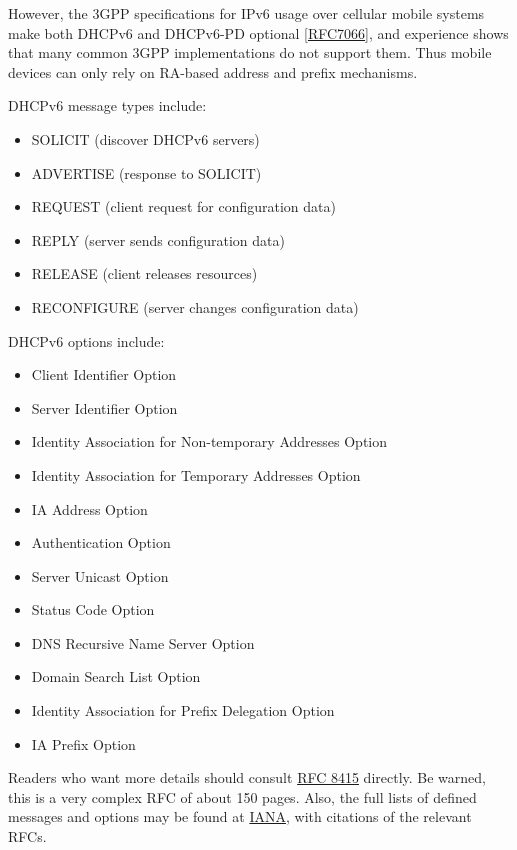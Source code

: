 \documentclass[
]{article}
\providecommand{\tightlist}{%
  \setlength{\itemsep}{0pt}\setlength{\parskip}{0pt}}
\begin{document}
However, the 3GPP specifications for IPv6 usage over cellular mobile
systems make both DHCPv6 and DHCPv6-PD optional
{[}\href{https://www.rfc-editor.org/info/rfc7066}{RFC7066}{]}, and
experience shows that many common 3GPP implementations do not support
them. Thus mobile devices can only rely on RA-based address and prefix
mechanisms.

DHCPv6 message types include:

\begin{itemize}
\tightlist
\item
  SOLICIT (discover DHCPv6 servers)
\item
  ADVERTISE (response to SOLICIT)
\item
  REQUEST (client request for configuration data)
\item
  REPLY (server sends configuration data)
\item
  RELEASE (client releases resources)
\item
  RECONFIGURE (server changes configuration data)
\end{itemize}

DHCPv6 options include:

\begin{itemize}
\tightlist
\item
  Client Identifier Option
\item
  Server Identifier Option
\item
  Identity Association for Non-temporary Addresses Option
\item
  Identity Association for Temporary Addresses Option
\item
  IA Address Option
\item
  Authentication Option
\item
  Server Unicast Option
\item
  Status Code Option
\item
  DNS Recursive Name Server Option
\item
  Domain Search List Option
\item
  Identity Association for Prefix Delegation Option
\item
  IA Prefix Option
\end{itemize}

Readers who want more details should consult
\href{https://www.rfc-editor.org/info/rfc8415}{RFC 8415} directly. Be
warned, this is a very complex RFC of about 150 pages. Also, the full
lists of defined messages and options may be found at
\href{https://www.iana.org/assignments/dhcpv6-parameters/dhcpv6-parameters.xhtml}{IANA},
with citations of the relevant RFCs.
\end{document}
